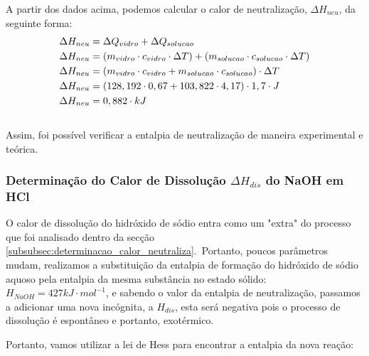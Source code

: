            \indent A partir dos dados acima, podemos calcular o calor de neutralização, $\Delta{H_{neu}}$, da seguinte forma:\
            \begin{equation}
                \begin{split}
                	\notag
                    \Delta{H_{neu}} &= \Delta Q_{vidro} + \Delta Q_{solucao} \\
                    \Delta{H_{neu}} &= (m_{vidro} \cdot c_{vidro} \cdot \Delta T) + (m_{solucao} \cdot c_{solucao} \cdot \Delta T) \\
                    \Delta{H_{neu}} &= (m_{vidro} \cdot c_{vidro} + m_{solucao} \cdot c_{solucao}) \cdot \Delta T \\
                    \Delta{H_{neu}} &= (128,192 \cdot 0,67 + 103,822 \cdot 4,17) \cdot 1,7 \cdot J \\
                    \Delta{H_{neu}} &= 0,882 \cdot kJ
                \end{split}
            \end{equation}\\

            \indent Assim, foi possível verificar a entalpia de neutralização de maneira experimental e teórica.\\
        
            
            \subsubsection{Determinação do Calor de Dissolução $\Delta{H_{dis}}$ do NaOH em HCl}\label{subsubsec:determinacao_calor_dissolucao}
            \indent O calor de dissolução do hidróxido de sódio entra como um "extra" do processo que foi analisado dentro da secção \ref{subsubsec:determinacao_calor_neutraliza}.\ Portanto, poucos parâmetros mudam, realizamos a substituição da entalpia de formação do hidróxido de sódio aquoso pela entalpia da mesma substância no estado sólido: $H_{NaOH} = 427 kJ \cdot mol^{-1}$, e sabendo o valor da entalpia de neutralização, passamos a adicionar uma nova incógnita, a $H_{dis}$, esta será negativa pois o processo de dissolução é espontâneo e portanto, exotérmico.\
            
            \indent Portanto, vamos utilizar a lei de Hess para encontrar a entalpia da nova reação:\

